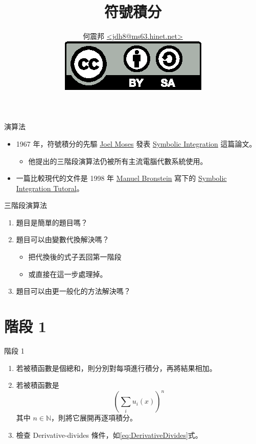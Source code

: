 \documentclass{beamer}
\title{符號積分}
\author[何震邦]{何震邦 \href{mailto:jdh8@ms63.hinet.net}{\textless jdh8@ms63.hinet.net\textgreater}\\
    \href{http://creativecommons.org/licenses/by-sa/3.0/tw/deed.zh\textunderscore TW}{\includegraphics{by-sa.eps}}}
\newcommand{\N}{\mathbb N}
\theoremstyle{remark}
\begin{document}
\begin{CJK}{UTF8}{bsmi}
\maketitle

\begin{frame}{演算法}
  \begin{itemize}
    \item 1967 年，符號積分的先驅 \href{http://en.wikipedia.org/wiki/Joel\textunderscore Moses}{Joel Moses} 發表
      \href{http://www.softwarepreservation.org/projects/LISP/MIT/MIT-LCS-TR-047-corrected-ocr.pdf}{Symbolic Integration}
      這篇論文。
      \begin{itemize}
	\item 他提出的三階段演算法仍被所有主流電腦代數系統使用。
      \end{itemize}
    \item 一篇比較現代的文件是 1998 年
      \href{http://www-sop.inria.fr/cafe/Manuel.Bronstein/bronstein-eng.html}{Manuel Bronstein} 寫下的
      \href{http://www-sop.inria.fr/cafe/Manuel.Bronstein/publications/issac98.pdf}{Symbolic Integration Tutoral}。
  \end{itemize}
\end{frame}

\begin{frame}{三階段演算法}
  \begin{enumerate}
    \item 題目是簡單的題目嗎？
    \item 題目可以由變數代換解決嗎？
      \begin{itemize}
	\item 把代換後的式子丟回第一階段
	\item 或直接在這一步處理掉。
      \end{itemize}
    \item 題目可以由更一般化的方法解決嗎？
  \end{enumerate}
\end{frame}

\section{階段 1}
\begin{frame}{階段 1}
  \begin{enumerate}
    \item 若被積函數是個總和，則分別對每項進行積分，再將結果相加。
    \item 若被積函數是
      \[\left( \sum_i u_i(x) \right)^n\]
      其中 $n \in \N$，則將它展開再逐項積分。
    \item 檢查 Derivative-divides 條件，如\eqref{eq:DerivativeDivides}式。
  \end{enumerate}
\end{frame}


\end{CJK}
\end{document}
